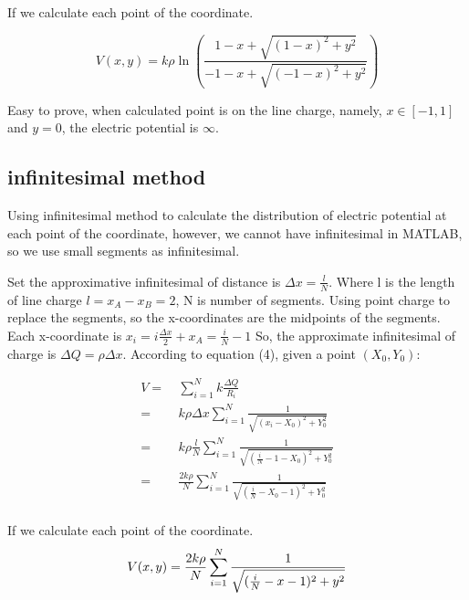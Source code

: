 \documentclass[10pt, journal, final]{IEEEtran}
\begin{document}
If we calculate each point of the coordinate.

\begin{equation}
    V(x,y)=k\rho\ln{\left(
        \frac{1-x+\sqrt{(1-x)^2+y^2}}{-1-x+\sqrt{(-1-x)^2+y^2}}
        \right)}
\end{equation}

Easy to prove, when calculated point is on the line charge, namely, $x\in[-1,1]$ and $y = 0$,
the electric potential is $\infty$.

\subsection{
    infinitesimal method
}\label{
    method:infinitesimal
}

Using infinitesimal method to calculate the distribution of electric potential
at each point of the coordinate, however, we cannot have infinitesimal in MATLAB,
so we use small segments as infinitesimal.\par
Set the approximative infinitesimal of distance is $\Delta x = \frac{l}{N}$.
Where l is the length of line charge $l = x_A - x_B = 2$, N is number of segments.
Using point charge to replace the segments,
so the x-coordinates are the midpoints of the segments.
Each x-coordinate is $x_i = i\frac{\Delta x}{2} + x_A = \frac{i}{N} - 1$
So, the approximate infinitesimal of charge is $\Delta Q = \rho \Delta x$.
According to equation (4), given a point $(X_0, Y_0)$:

\begin{equation}
    \begin{aligned}
        V = & \ \sum_{i=1}^N k\frac{\Delta Q}{R_i}                                             \\
        =   & \ k\rho \Delta x\sum_{i=1}^N \frac{1}{\sqrt{(x_i - X_0)^2+Y_0^2}}                \\
        =   & \ k\rho \frac{l}{N}\sum_{i=1}^N \frac{1}{\sqrt{(\frac{i}{N} - 1 - X_0)^2+Y_0^2}} \\
        =   & \ \frac{2k\rho}{N}
        \sum_{i=1}^N \frac{1}{\sqrt{(\frac{i}{N} - X_0 - 1)^2+Y_0^2}}                          \\
    \end{aligned}
\end{equation}

If we calculate each point of the coordinate.
\begin{equation}
    V(x,y) = \frac{2k\rho}{N}\sum_{i=1}^N \frac{1}{\sqrt{(\frac{i}{N} - x - 1)^2+y^2}} \\
\end{equation}
\end{document}
